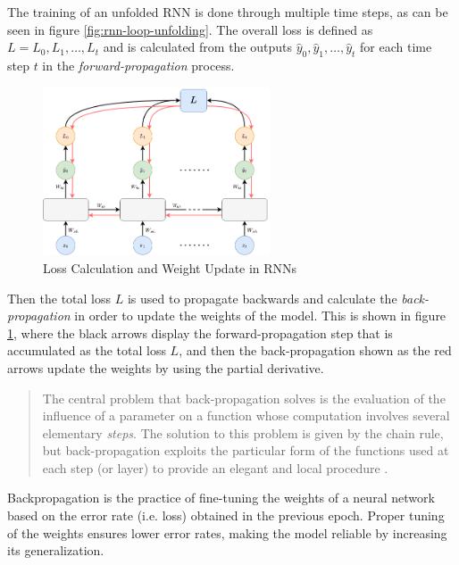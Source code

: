             The training of an unfolded RNN is done through multiple time steps, as can be seen in figure \ref{fig:rnn-loop-unfolding}.
            The overall loss is defined as $L = L_0, L_1, \dots, L_t$ and is calculated from the outputs $\hat{y}_0, \hat{y}_1, \dots, \hat{y}_t$  for each time step $t$ in the \emph{forward-propagation} process.
            \begin{figure}[h!]
                \centering
                \includegraphics[width=0.6\textwidth]{figures/rnn_loss_calculation.drawio.png}
                \caption{Loss Calculation and Weight Update in RNNs}
                \label{fig:loss-calculation-weight-update-rnn}
            \end{figure}
            Then the total loss $L$ is used to propagate backwards and calculate the \emph{back-propagation} in order to update the weights of the model.
            This is shown in figure \ref{fig:loss-calculation-weight-update-rnn}, where the black arrows display the forward-propagation step that is accumulated as the total loss $L$, and then the back-propagation shown as the red arrows update the weights by using the partial derivative.

            \begin{quote}
                The central problem that back-propagation solves is the evaluation of the influence of a parameter on a function whose computation involves several elementary \emph{steps}. The solution to this problem is given by the chain rule, but back-propagation exploits the particular form of the functions used at each step (or layer) to provide an elegant and local procedure \cite{lecunTheoreticalFrameworkBackpropagation1988}.
            \end{quote}
            Backpropagation is the practice of fine-tuning the weights of a neural network based on the error rate (i.e. loss) obtained in the previous epoch. Proper tuning of the weights ensures lower error rates, making the model reliable by increasing its generalization.


